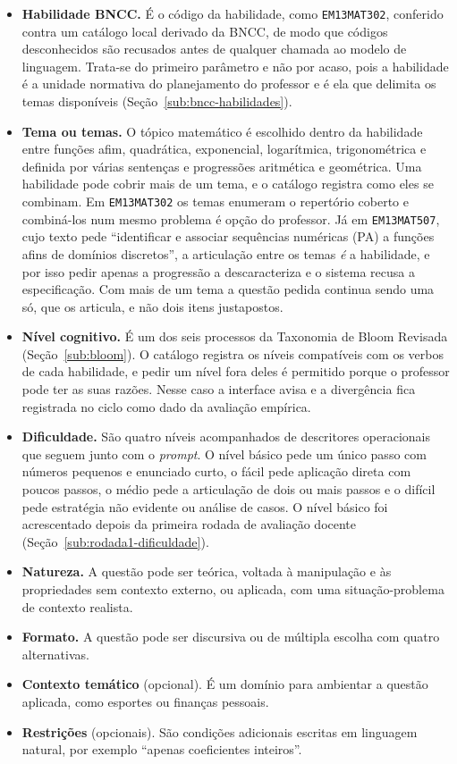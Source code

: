 \begin{itemize}
\item \textbf{Habilidade BNCC.} É o código da habilidade, como \texttt{EM13MAT302}, conferido
  contra um catálogo local derivado da BNCC, de modo que códigos desconhecidos são recusados antes
  de qualquer chamada ao modelo de linguagem. Trata-se do primeiro parâmetro e não por acaso, pois a
  habilidade é a unidade normativa do planejamento do professor e é ela que delimita os temas
  disponíveis (Seção~\ref{sub:bncc-habilidades}).
\item \textbf{Tema ou temas.} O tópico matemático é escolhido dentro da habilidade entre funções
  afim, quadrática, exponencial, logarítmica, trigonométrica e definida por várias sentenças e
  progressões aritmética e geométrica. Uma habilidade pode cobrir mais de um tema, e o catálogo
  registra como eles se combinam. Em \texttt{EM13MAT302} os temas enumeram o repertório coberto e
  combiná-los num mesmo problema é opção do professor. Já em \texttt{EM13MAT507}, cujo texto pede
  ``identificar e associar sequências numéricas (PA) a funções afins de domínios discretos'', a
  articulação entre os temas \emph{é} a habilidade, e por isso pedir apenas a progressão a
  descaracteriza e o sistema recusa a especificação. Com mais de um tema a questão pedida continua
  sendo uma só, que os articula, e não dois itens justapostos.
\item \textbf{Nível cognitivo.} É um dos seis processos da Taxonomia de Bloom Revisada
  (Seção~\ref{sub:bloom}). O catálogo registra os níveis compatíveis com os verbos de cada
  habilidade, e pedir um nível fora deles é permitido porque o professor pode ter as suas razões.
  Nesse caso a interface avisa e a divergência fica registrada no ciclo como dado da avaliação
  empírica.
\item \textbf{Dificuldade.} São quatro níveis acompanhados de descritores operacionais que seguem
  junto com o \emph{prompt}. O nível básico pede um único passo com números pequenos e enunciado
  curto, o fácil pede aplicação direta com poucos passos, o médio pede a articulação de dois ou mais
  passos e o difícil pede estratégia não evidente ou análise de casos. O nível básico foi acrescentado
  depois da primeira rodada de avaliação docente (Seção~\ref{sub:rodada1-dificuldade}).
\item \textbf{Natureza.} A questão pode ser teórica, voltada à manipulação e às propriedades sem
  contexto externo, ou aplicada, com uma situação-problema de contexto realista.
\item \textbf{Formato.} A questão pode ser discursiva ou de múltipla escolha com quatro
  alternativas.
\item \textbf{Contexto temático} (opcional). É um domínio para ambientar a questão aplicada, como
  esportes ou finanças pessoais.
\item \textbf{Restrições} (opcionais). São condições adicionais escritas em linguagem natural, por
  exemplo ``apenas coeficientes inteiros''.
\end{itemize}

